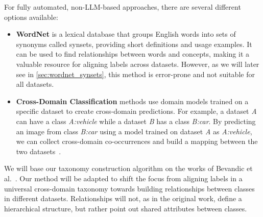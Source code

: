 For fully automated, non-LLM-based approaches, there are several different options available:
\begin{itemize}
      \item \textbf{WordNet} is a lexical database that groups English words into sets of synonyms called synsets, providing short definitions and usage examples.
            It can be used to find relationships between words and concepts, making it a valuable resource for aligning labels across datasets.
            However, as we will later see in \ref{sec:wordnet_synsets}, this method is error-prone and not suitable for all datasets.
      \item \textbf{Cross-Domain Classification} methods use domain models trained on a specific dataset to create cross-domain predictions.
            For example, a dataset \textit{A} can have a class \textit{A:vehicle} while a dataset \textit{B}
            has a class \textit{B:car}. By predicting an image from class \textit{B:car} using a model trained on dataset \textit{A}
            as \textit{A:vehicle}, we can collect cross-domain co-occurrences and build a mapping between the two datasets~\cite{uijlings_missing_2022,bevandic_automatic_2022,bevandic_weakly_2024}.
\end{itemize}

We will base our taxonomy construction algorithm on the works of Bevandic et al.~\cite{bevandic_automatic_2022,bevandic_weakly_2024}.
Our method will be adapted to shift the focus from aligning labels in a universal cross-domain taxonomy
towards building relationships between classes in different datasets.
Relationships will not, as in the original work, define a hierarchical structure,
but rather point out shared attributes between classes.

